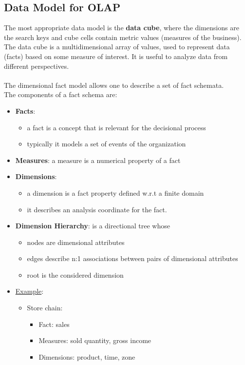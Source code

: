 \documentclass[10pt,a4paper]{article}
\newcommand{\nline}{\\~\\}
\begin{document}
\subsection{Data Model for OLAP}
The most appropriate data model is the \textbf{data cube}, where the dimensions are the search keys and cube cells contain metric values (measures of the business). The data cube is a multidimensional array of values, used to represent data (facts) based on some measure of interest. It is useful to analyze data from different perspectives. \nline
The dimensional fact model allows one to describe a set of fact schemata. \\
The components of a fact schema are:
\begin{itemize}
	\item \textbf{Facts}: 
	\begin{itemize}
		\item a fact is a concept that is relevant for the decisional process
		\item typically it models a set of events of the organization
	\end{itemize}
	\item \textbf{Measures}: a measure is a numerical property of a fact
	\item \textbf{Dimensions}:
	\begin{itemize}
		\item a dimension is a fact property defined w.r.t a finite domain
		\item it describes an analysis coordinate for the fact.
	\end{itemize}
	\item \textbf{Dimension Hierarchy}: is a directional tree whose
	\begin{itemize}
		\item nodes are dimensional attributes
		\item edges describe n:1 associations between pairs of dimensional attributes
		\item root is the considered dimension
\end{itemize}
	\item \uline{Example}:
	\begin{itemize}
		\item Store chain:
		\begin{itemize}
			\item Fact: sales
			\item Measures: sold quantity, gross income
			\item Dimensions: product, time, zone
		\end{itemize}
	\end{itemize}
\end{itemize}
\end{document}

